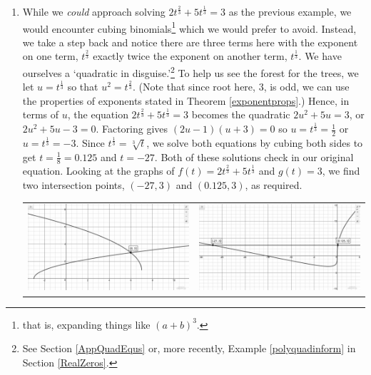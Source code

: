 \documentclass{ximera}
\begin{document}
\begin{ex}
\begin{enumerate}
\item  While we \textit{could} approach solving  $2t^{\frac{2}{3}} + 5t^{\frac{1}{3}} = 3$ as the previous example, we would encounter cubing binomials\footnote{that is, expanding things like $(a+b)^3$.} which we would prefer to avoid.  Instead, we take a step back and notice there are three terms here with the exponent on one term, $t^{\frac{2}{3}}$ exactly twice the exponent on another term, $t^{\frac{1}{3}}$.  We have ourselves a `quadratic in disguise.'\footnote{See Section \ref{AppQuadEqus} or, more recently, Example \ref{polyquadinform} in Section \ref{RealZeros}.} To help us see the forest for the trees, we let $u = t^{\frac{1}{3}}$ so that $u^2 = t^{\frac{2}{3}}$. (Note that since root here, $3$, is odd, we can use the properties of exponents stated in Theorem \ref{exponentprops}.)  Hence, in terms of $u$, the equation   $2t^{\frac{2}{3}} + 5t^{\frac{1}{3}} = 3$ becomes the quadratic $2u^2 + 5u = 3$, or $2u^2 + 5u - 3 = 0$.  Factoring gives $(2u-1)(u+3) = 0$ so $u = t^{\frac{1}{3}} = \frac{1}{2}$ or $u = t^{\frac{1}{3}} = -3$.  Since $t^{\frac{1}{3}} = \sqrt[3]{t}$, we solve both equations by cubing both sides to get $t = \frac{1}{8} = 0.125$ and $t = -27$.  Both of these solutions check in our original equation.  Looking at the graphs of $f(t) = 2t^{\frac{2}{3}} + 5t^{\frac{1}{3}}$ and $g(t) = 3$, we find two intersection points, $(-27,3)$ and $(0.125,3)$, as required.

\begin{center}

\begin{tabular}{cc}

\includegraphics[width=3in]{./PowerEqIneqGraphics/PowerEqEx03.jpg} & \includegraphics[width=3in]{./PowerEqIneqGraphics/PowerEqEx04.jpg} \\


\end{tabular}
\end{center}
\end{enumerate}
\end{ex}
\end{document}
